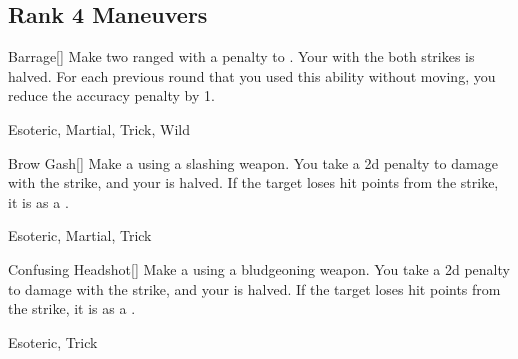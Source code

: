 \subsection{Rank 4 Maneuvers}

\lowercase{\hypertarget{maneuver:Barrage}{}}\label{maneuver:Barrage}
\hypertarget{maneuver:Barrage}{}
\begin{freeability}[Rank 4]{Barrage}[]
Make two ranged  with a  penalty to .
Your  with the both strikes is halved.
For each previous round that you used this ability without moving, you reduce the accuracy penalty by 1.


 Esoteric, Martial, Trick, Wild
\end{freeability}
\vspace{0.25em}



\lowercase{\hypertarget{maneuver:Brow Gash}{}}\label{maneuver:Brow Gash}
\hypertarget{maneuver:Brow Gash}{}
\begin{freeability}[Rank 4]{Brow Gash}[]
Make a  using a slashing weapon.
You take a \minus2d penalty to damage with the strike, and your  is halved.
If the target loses hit points from the strike, it is  as a .


 Esoteric, Martial, Trick
\end{freeability}
\vspace{0.25em}



\lowercase{\hypertarget{maneuver:Confusing Headshot}{}}\label{maneuver:Confusing Headshot}
\hypertarget{maneuver:Confusing Headshot}{}
\begin{freeability}[Rank 4]{Confusing Headshot}[]
Make a  using a bludgeoning weapon.
You take a \minus2d penalty to damage with the strike, and your  is halved.
If the target loses hit points from the strike, it is  as a .


 Esoteric, Trick
\end{freeability}
\vspace{0.25em}



